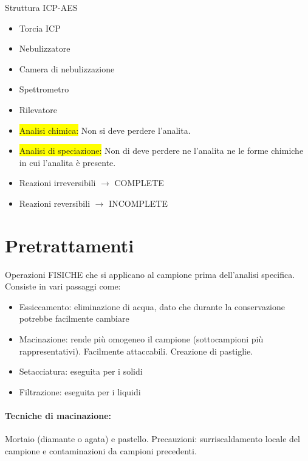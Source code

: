 \documentclass{article}
\begin{document}
Struttura ICP-AES
\begin{itemize}
	\item Torcia ICP
	\item Nebulizzatore
	\item Camera di nebulizzazione
	\item Spettrometro
	\item Rilevatore
\end{itemize}

\hrulefill

\begin{itemize}
	\item \colorbox{yellow}{Analisi chimica:} Non si deve perdere l'analita.
	\item \colorbox{yellow}{Analisi di speciazione:} Non di deve perdere ne l'analita ne le forme chimiche in cui l'analita  è presente.
\end{itemize}

\begin{itemize}
	\item Reazioni irreversibili $\rightarrow$ COMPLETE
	\item Reazioni reversibili $\rightarrow$ INCOMPLETE
\end{itemize}

\newpage


\section{Pretrattamenti}

Operazioni FISICHE che si applicano al campione prima dell'analisi specifica. Consiste in vari passaggi come:

\begin{itemize}
	\item Essiccamento: eliminazione di acqua, dato che durante la conservazione potrebbe facilmente cambiare
	\item Macinazione: rende più omogeneo il campione (sottocampioni più rappresentativi). Facilmente attaccabili. Creazione di pastiglie.
	\item Setacciatura: eseguita per i solidi 
	\item Filtrazione: eseguita per i liquidi
\end{itemize}

\paragraph{Tecniche di macinazione:} Mortaio (diamante o agata) e pastello. Precauzioni: surriscaldamento locale del campione e contaminazioni da campioni precedenti.
\end{document}

